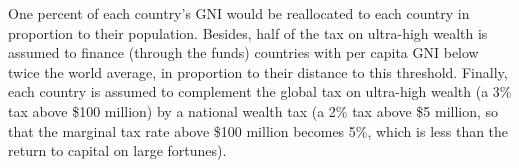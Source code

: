 \documentclass[12pt,english]{article}
\begin{document}
\begin{bibunit}
\begin{table}[h]
  \caption{Estimated revenues from new global taxes (in billions of dollars per year).\label{tab:revenue}} 
\end{table}

One percent of each country's GNI would be reallocated to each country in proportion to their population. Besides, half of the tax on ultra-high wealth is assumed to finance (through the funds) countries with per capita GNI below twice the world average, in proportion to their distance to this threshold. Finally, each country is assumed to complement the global tax on ultra-high wealth (a 3\% tax above \$100 million) by a national wealth tax (a 2\% tax above \$5 million, so that the marginal tax rate above \$100 million becomes 5\%, which is less than the return to capital on large fortunes). 


\end{bibunit}
\end{document}
